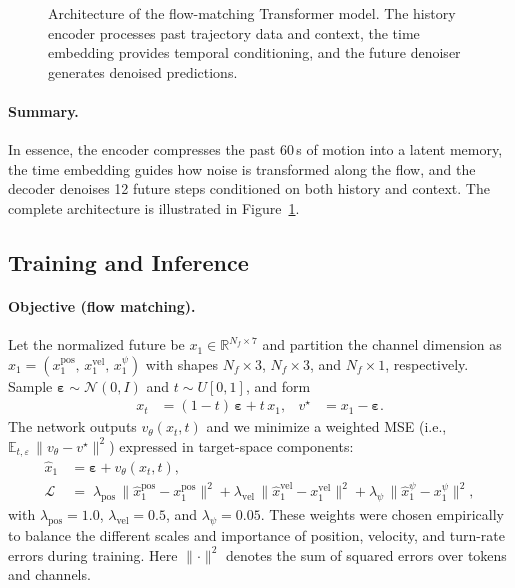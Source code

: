 \documentclass[
  manuscript=proceedings,  %
  layout=preprint,  %
  year=20xx,
  volume=x,
]{extra/joas}
\begin{document}
\begin{figure}[hbt]
    \centering
    
    \caption{Architecture of the flow-matching Transformer model. The history encoder processes past trajectory data and context, the time embedding provides temporal conditioning, and the future denoiser generates denoised predictions.}
    \label{fig:model}
\end{figure}

\paragraph{Summary.}
In essence, the encoder compresses the past 60\,s of motion into a latent memory, the time embedding guides how noise is transformed along the flow, and the decoder denoises 12 future steps conditioned on both history and context. The complete architecture is illustrated in Figure~\ref{fig:model}.

\subsection{Training and Inference}

\paragraph{Objective (flow matching).}
Let the normalized future be $x_1 \in \mathbb{R}^{N_f \times 7}$ and partition the
channel dimension as
$x_1=(x_1^{\text{pos}},\,x_1^{\text{vel}},\,x_1^{\psi})$
with shapes $N_f{\times}3$, $N_f{\times}3$, and $N_f{\times}1$, respectively.
Sample $\boldsymbol{\varepsilon}\sim\mathcal{N}(0,I)$ and $t\sim U[0,1]$, and form
\begin{align}
x_t &= (1-t)\,\boldsymbol{\varepsilon} + t\,x_1, &
v^\star &= x_1 - \boldsymbol{\varepsilon}. \label{eq:fm_target}
\end{align}
The network outputs $v_\theta(x_t,t)$ and we minimize a weighted MSE
(i.e., $\mathbb{E}_{t,\varepsilon}\,\lVert v_\theta - v^\star \rVert^2$) expressed in target-space
components:
\begin{align}
\hat{x}_1 &= \boldsymbol{\varepsilon} + v_\theta(x_t,t), \\
\mathcal{L} \; &= \;
\lambda_{\text{pos}} \,\lVert \hat{x}_1^{\text{pos}} - x_1^{\text{pos}} \rVert^2
+ \lambda_{\text{vel}} \,\lVert \hat{x}_1^{\text{vel}} - x_1^{\text{vel}} \rVert^2
+ \lambda_{\psi}    \,\lVert \hat{x}_1^{\psi}     - x_1^{\psi}     \rVert^2,
\end{align}
with $\lambda_{\text{pos}}{=}1.0$, $\lambda_{\text{vel}}{=}0.5$, and $\lambda_{\psi}{=}0.05$. These weights were chosen empirically to balance the different scales and importance of position, velocity, and turn-rate errors during training.
Here $\lVert\cdot\rVert^2$ denotes the sum of squared errors over tokens and channels.
\end{document}
